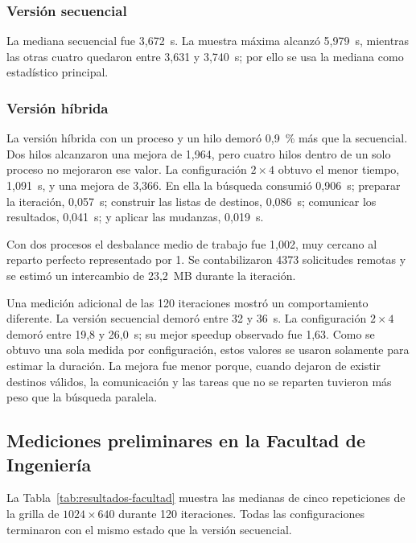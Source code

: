 \subsubsection{Versión secuencial}

La mediana secuencial fue 3,672~s. La muestra máxima alcanzó 5,979~s, mientras las otras cuatro quedaron entre 3,631 y 3,740~s; por ello se usa la mediana como estadístico principal.

\subsubsection{Versión híbrida}

La versión híbrida con un proceso y un hilo demoró 0,9~\% más que la secuencial. Dos hilos alcanzaron una mejora de 1,964, pero cuatro hilos dentro de un solo proceso no mejoraron ese valor. La configuración $2\times4$ obtuvo el menor tiempo, 1,091~s, y una mejora de 3,366. En ella la búsqueda consumió 0,906~s; preparar la iteración, 0,057~s; construir las listas de destinos, 0,086~s; comunicar los resultados, 0,041~s; y aplicar las mudanzas, 0,019~s.

Con dos procesos el desbalance medio de trabajo fue 1,002, muy cercano al reparto perfecto representado por 1. Se contabilizaron 4373 solicitudes remotas y se estimó un intercambio de 23,2~MB durante la iteración.

Una medición adicional de las 120 iteraciones mostró un comportamiento diferente. La versión secuencial demoró entre 32 y 36~s. La configuración $2\times4$ demoró entre 19,8 y 26,0~s; su mejor speedup observado fue 1,63. Como se obtuvo una sola medida por configuración, estos valores se usaron solamente para estimar la duración. La mejora fue menor porque, cuando dejaron de existir destinos válidos, la comunicación y las tareas que no se reparten tuvieron más peso que la búsqueda paralela.

\subsection{Mediciones preliminares en la Facultad de Ingeniería}

La Tabla~\ref{tab:resultados-facultad} muestra las medianas de cinco repeticiones
de la grilla de $1024\times640$ durante 120 iteraciones. Todas las configuraciones terminaron con el mismo estado que la versión secuencial.

